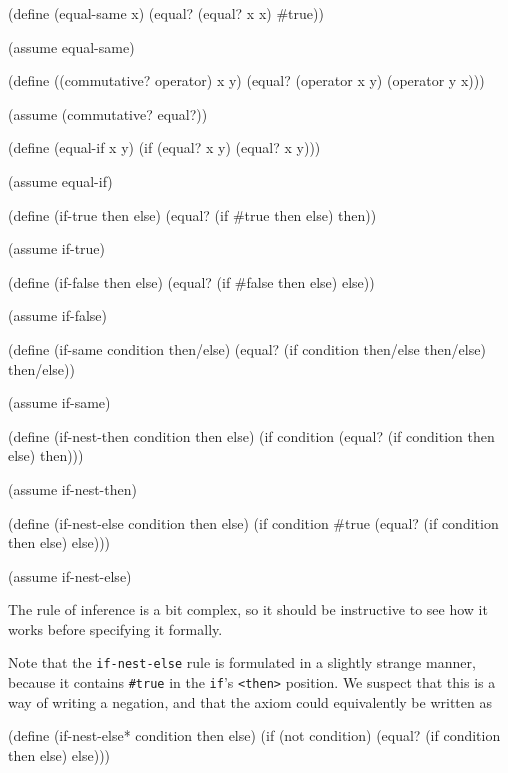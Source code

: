 \begin{Snippet}
  (define (equal-same x)
    (equal? (equal? x x) #true))

  (assume equal-same)
\end{Snippet}
\begin{Snippet}
  (define ((commutative? operator) x y)
    (equal? (operator x y) (operator y x)))

  (assume (commutative? equal?))
\end{Snippet}
\begin{Snippet}
  (define (equal-if x y)
    (if (equal? x y) (equal? x y)))

  (assume equal-if)
\end{Snippet}
\begin{Snippet}
  (define (if-true then else)
    (equal? (if #true then else) then))

  (assume if-true)
\end{Snippet}
\begin{Snippet}
  (define (if-false then else)
    (equal? (if #false then else) else))

  (assume if-false)
\end{Snippet}
\begin{Snippet}
  (define (if-same condition then/else)
    (equal? (if condition then/else then/else)
            then/else))

  (assume if-same)
\end{Snippet}
\begin{Snippet}
  (define (if-nest-then condition then else)
    (if condition
        (equal? (if condition then else) then)))

  (assume if-nest-then)
\end{Snippet}
\begin{Snippet}
  (define (if-nest-else condition then else)
    (if condition
        #true
        (equal? (if condition then else) else)))

  (assume if-nest-else)
\end{Snippet}

The rule of inference is a bit complex, so it should be instructive
to see how it works before specifying it formally.

Note that the \texttt{if-nest-else} rule is formulated in a slightly
strange manner, because it contains \texttt{\#true} in the \texttt{if}'s
\texttt{<then>} position. We suspect that this is a way of writing
a negation, and that the axiom could equivalently be written as
\begin{Snippet}
  (define (if-nest-else* condition then else)
    (if (not condition)
      (equal? (if condition then else) else)))
\end{Snippet}

